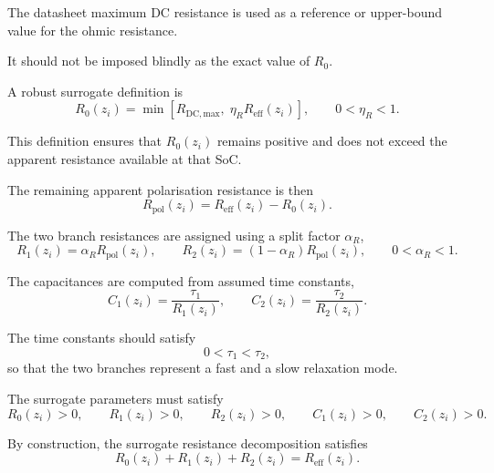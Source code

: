 \documentclass[a4paper,12pt]{article}
\begin{document}
The datasheet maximum DC resistance is used as a reference or upper-bound value for the ohmic resistance.

It should not be imposed blindly as the exact value of \(R_0\).

A robust surrogate definition is
\begin{equation}
R_0(z_i)
=
\min
\left[
R_{\mathrm{DC,max}},
\;
\eta_R R_{\mathrm{eff}}(z_i)
\right],
\qquad
0<\eta_R<1.
\label{eq:method_surrogate_r0_bounded}
\end{equation}

This definition ensures that \(R_0(z_i)\) remains positive and does not exceed the apparent resistance available at that SoC.

The remaining apparent polarisation resistance is then
\begin{equation}
R_{\mathrm{pol}}(z_i)
=
R_{\mathrm{eff}}(z_i)
-
R_0(z_i).
\label{eq:method_surrogate_rpol_consistent}
\end{equation}

The two branch resistances are assigned using a split factor \(\alpha_R\),
\begin{equation}
R_1(z_i)
=
\alpha_R R_{\mathrm{pol}}(z_i),
\qquad
R_2(z_i)
=
\left(1-\alpha_R\right)R_{\mathrm{pol}}(z_i),
\qquad
0<\alpha_R<1.
\label{eq:method_surrogate_resistance_split}
\end{equation}

The capacitances are computed from assumed time constants,
\begin{equation}
C_1(z_i)
=
\frac{\tau_1}{R_1(z_i)},
\qquad
C_2(z_i)
=
\frac{\tau_2}{R_2(z_i)}.
\label{eq:method_surrogate_capacitances}
\end{equation}

The time constants should satisfy
\begin{equation}
0<\tau_1<\tau_2,
\label{eq:method_surrogate_time_constant_order}
\end{equation}
so that the two branches represent a fast and a slow relaxation mode.

The surrogate parameters must satisfy
\begin{equation}
R_0(z_i)>0,
\qquad
R_1(z_i)>0,
\qquad
R_2(z_i)>0,
\qquad
C_1(z_i)>0,
\qquad
C_2(z_i)>0.
\label{eq:method_surrogate_positive_parameters}
\end{equation}

By construction, the surrogate resistance decomposition satisfies
\begin{equation}
R_0(z_i)+R_1(z_i)+R_2(z_i)
=
R_{\mathrm{eff}}(z_i).
\label{eq:method_surrogate_static_consistency}
\end{equation}
\end{document}
